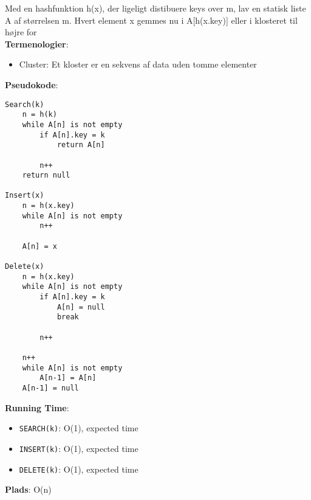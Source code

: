 Med en hashfunktion h(x), der ligeligt distibuere keys over m, lav en statisk liste A af størrelsen m. Hvert element x gemmes nu i A[h(x.key)] eller i klosteret til højre for\\
\textbf{Termenologier}:
\begin{itemize}
	\item Cluster: Et kloster er en sekvens af data uden tomme elementer
\end{itemize}
\textbf{Pseudokode}:
\begin{lstlisting}[frame=single, mathescape=true]
Search(k)
	n = h(k)
	while A[n] is not empty
		if A[n].key = k
			return A[n]
		
		n++
	return null

Insert(x)
	n = h(x.key)
	while A[n] is not empty
		n++
	
	A[n] = x

Delete(x)
	n = h(x.key)
	while A[n] is not empty
		if A[n].key = k
			A[n] = null
			break
		
		n++

	n++
	while A[n] is not empty
		A[n-1] = A[n]
	A[n-1] = null
\end{lstlisting}
\textbf{Running Time}:
\begin{itemize}
	\item \texttt{SEARCH(k)}: O(1), expected time
	\item \texttt{INSERT(k)}: O(1), expected time
	\item \texttt{DELETE(k)}: O(1), expected time
\end{itemize}
\textbf{Plads}: O(n)